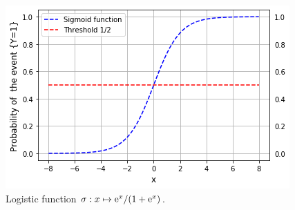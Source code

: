 \begin{figure}
\begin{center}
\includegraphics[width = .7\linewidth]{./Illustrations/logistic_function.png}
\end{center}
\caption{Logistic function $\sigma: x \mapsto \mathrm{e}^x/(1+\mathrm{e}^x)$.}
\end{figure}

